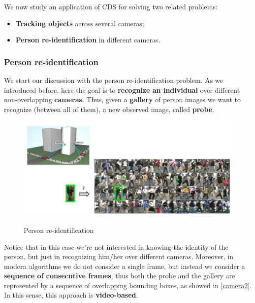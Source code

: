 We now study an application of CDS for solving two related problems:

\begin{itemize}
    \item \textbf{Tracking objects} across several cameras;
    \item \textbf{Person re-identification} in different cameras.
\end{itemize}

\subsubsection{Person re-identification}
We start our discussion with the person re-identification problem. As we introduced before, here the goal is to \textbf{recognize an individual} over different non-overlapping \textbf{cameras}. Thus, given a \textbf{gallery} of person images we want to recognize (between all of them), a new observed image, called \textbf{probe}.

\begin{figure}[h!]
    \centering
    \includegraphics[scale = 1.5]{img/camera1.jpg}
    \label{camera1}
    \caption{Person re-identification}
\end{figure}

Notice that in this case we're not interested in knowing the identity of the person, but just in recognizing him/her over different cameras. Moreover, in modern algorithms we do not consider a single frame, but instead we consider a \textbf{sequence of consecutive frames}, thus both the probe and the gallery are represented by a sequence of overlapping bounding boxes, as showed in \ref{camera2}. In this sense, this approach is \textbf{video-based}.

